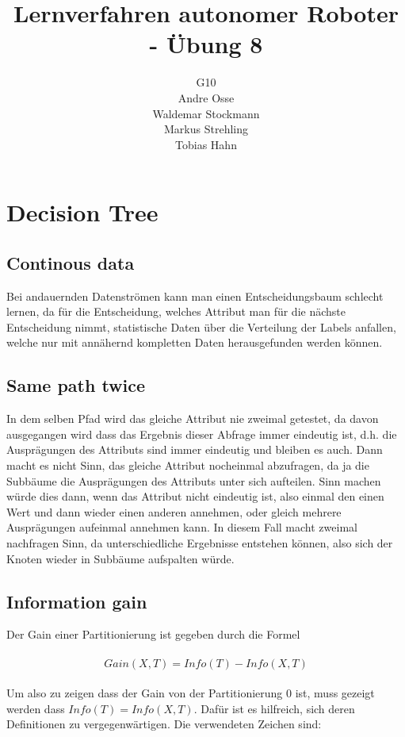\documentclass{article}
\title{Lernverfahren autonomer Roboter - Übung 8}
\author{G10\\ Andre Osse\\ Waldemar Stockmann\\ Markus Strehling\\ Tobias Hahn}
\begin{document}
\maketitle
\newpage
\section{Decision Tree}

\subsection{Continous data}
Bei andauernden Datenströmen kann man einen Entscheidungsbaum schlecht lernen, da für die Entscheidung, welches Attribut man für die nächste Entscheidung nimmt, statistische Daten über die Verteilung der Labels anfallen, welche nur mit annähernd kompletten Daten herausgefunden werden können.

\subsection{Same path twice}
In dem selben Pfad wird das gleiche Attribut nie zweimal getestet, da davon ausgegangen wird dass das Ergebnis dieser Abfrage immer eindeutig ist, d.h. die Ausprägungen des Attributs sind immer eindeutig und bleiben es auch. Dann macht es nicht Sinn, das gleiche Attribut nocheinmal abzufragen, da ja die Subbäume die Ausprägungen des Attributs unter sich aufteilen. Sinn machen würde dies dann, wenn das Attribut nicht eindeutig ist, also einmal den einen Wert und dann wieder einen anderen annehmen, oder gleich mehrere Ausprägungen aufeinmal annehmen kann. In diesem Fall macht zweimal nachfragen Sinn, da unterschiedliche Ergebnisse entstehen können, also sich der Knoten wieder in Subbäume aufspalten würde.

\subsection{Information gain}
Der Gain einer Partitionierung ist gegeben durch die Formel
\paragraph{}
\[
	Gain(X,T) = Info(T) - Info(X,T)
\]
\paragraph{}
Um also zu zeigen dass der Gain von der Partitionierung 0 ist, muss gezeigt werden dass $Info(T) = Info(X,T)$.
Dafür ist es hilfreich, sich deren Definitionen zu vergegenwärtigen. Die verwendeten Zeichen sind:
\end{document}
